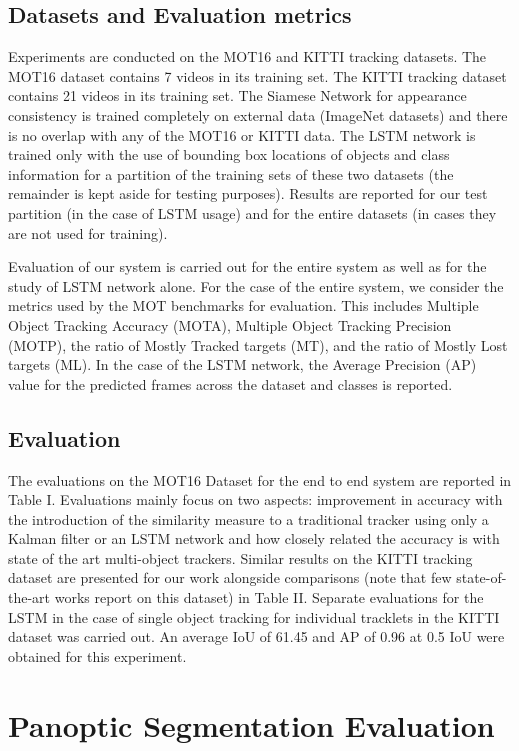 \subsection{Datasets and Evaluation metrics}
Experiments are conducted on the MOT16 \cite{DeepSiam:MilanL0RS16} and KITTI \cite{DeepSiam:KITTI} tracking datasets. The MOT16 dataset contains 7 videos in its training set. The KITTI tracking dataset contains 21 videos in its training set. The Siamese Network for appearance consistency is trained completely on external data (ImageNet datasets) and there is no overlap with any of the MOT16 or KITTI data. The LSTM network is trained only with the use of bounding box locations of objects and class information for a partition of the training sets of these two datasets (the remainder is kept aside for testing purposes). Results are reported for our test partition (in the case of LSTM usage) and for the entire datasets (in cases they are not used for training).
\par Evaluation of our system is carried out for the entire system as well as for the study of LSTM network alone. For the case of the entire system, we consider the metrics used by the MOT benchmarks for evaluation. This includes Multiple Object Tracking Accuracy (MOTA), Multiple Object Tracking Precision (MOTP), the ratio of Mostly Tracked targets (MT), and the ratio of Mostly Lost targets (ML). In the case of the LSTM network, the Average Precision (AP) value for the predicted frames across the dataset and classes is reported.

\subsection{Evaluation}
The evaluations on the MOT16 Dataset for the end to end system are reported in Table I. Evaluations mainly focus on two aspects: improvement in accuracy with the introduction of the similarity measure to a traditional tracker using only a Kalman filter or an LSTM network and how closely related the accuracy is with state of the art multi-object trackers. Similar results on the KITTI tracking dataset are presented for our work alongside comparisons (note that few state-of-the-art works report on this dataset) in Table II. Separate evaluations for the LSTM in the case of single object tracking for individual tracklets in the KITTI dataset was carried out. An average IoU of 61.45 and AP of 0.96 at 0.5 IoU were obtained for this experiment.


\section{Panoptic Segmentation Evaluation}

